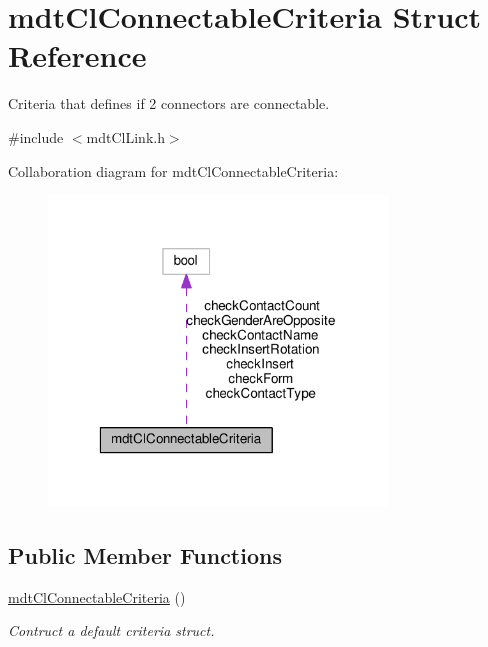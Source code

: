 \hypertarget{structmdt_cl_connectable_criteria}{\section{mdt\-Cl\-Connectable\-Criteria Struct Reference}
\label{structmdt_cl_connectable_criteria}
}


Criteria that defines if 2 connectors are connectable.  




{\ttfamily \#include $<$mdt\-Cl\-Link.\-h$>$}



Collaboration diagram for mdt\-Cl\-Connectable\-Criteria\-:
\nopagebreak
\begin{figure}[H]
\begin{center}
\leavevmode
\includegraphics[width=256pt]{structmdt_cl_connectable_criteria__coll__graph}
\end{center}
\end{figure}
\subsection*{Public Member Functions}
\begin{DoxyCompactItemize}
\item 
\hyperlink{structmdt_cl_connectable_criteria_a4b1714ec82d4ff747c685b223f94e870}{mdt\-Cl\-Connectable\-Criteria} ()
\begin{DoxyCompactList}\small\item\em Contruct a default criteria struct. \end{DoxyCompactList}\end{DoxyCompactItemize}
